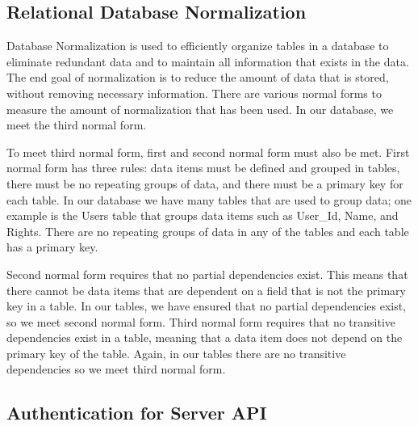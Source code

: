 \documentclass[12pt]{report}
\let\Oldsubsection\subsection
\renewcommand{\subsection}{\FloatBarrier\Oldsubsection}
\begin{document}
\subsection{Relational Database Normalization} \label{relational-database-normalization}


Database Normalization is used to efficiently organize tables in a database to eliminate redundant
data and to maintain all information that exists in the data. The end goal of normalization is to
reduce the amount of data that is stored, without removing necessary information. There are various
normal forms to measure the amount of normalization that has been used. In our database, we meet
the third normal form.

To meet third normal form, first and second normal form must also be met. First normal form
has three rules: data items must be defined and grouped in tables, there must be no repeating
groups of data, and there must be a primary key for each table. In our database we have many tables
that are used to group data; one example is the Users table that groups data items such as User_Id,
Name, and Rights. There are no repeating groups of data in any of the tables and each table has a
primary key.

Second normal form requires that no partial dependencies exist. This means that there
cannot be data items that are dependent on a field that is not the primary key in a table. In our
tables, we have ensured that no partial dependencies exist, so we meet second normal form.
Third normal form requires that no transitive dependencies exist in a table, meaning that a data item
does not depend on the primary key of the table. Again, in our tables there are no transitive dependencies
so we meet third normal form.

\subsection{Authentication for Server API} \label{authentication-for-server-api}

\end{document}
